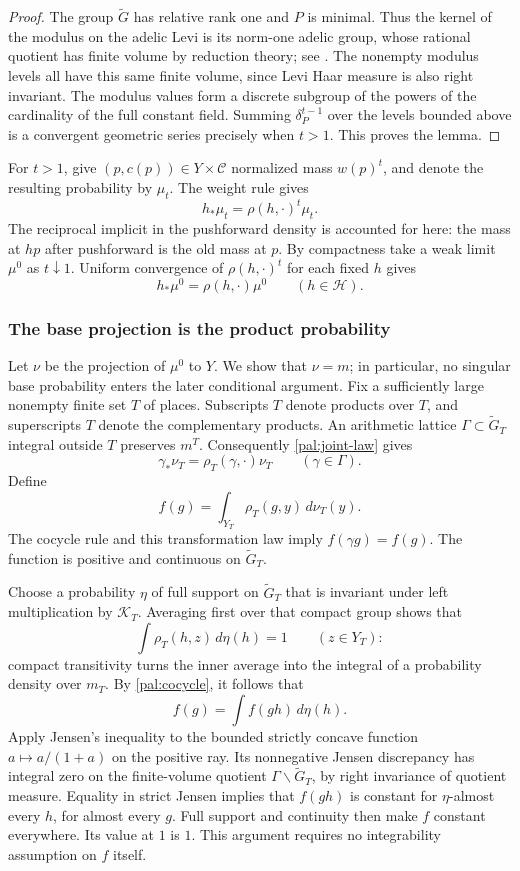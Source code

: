 \begin{proof}
The group $\widetilde G$ has relative rank one and $P$ is minimal.
Thus the kernel of the modulus on the adelic Levi is its norm-one
adelic group, whose rational quotient has finite volume by reduction
theory; see \cite{HarderReduction}.  The nonempty modulus levels all
have this same finite volume, since Levi Haar measure is also right
invariant.  The modulus values form a discrete subgroup of the powers
of the cardinality of the full constant field.  Summing
$\delta_P^{t-1}$ over the levels bounded above is a convergent geometric
series precisely when $t>1$.  This proves the lemma.
\end{proof}

For $t>1$, give $(p,c(p))\in Y\times\mathcal C$ normalized mass
$w(p)^t$, and denote the resulting probability by $\mu_t$.
The weight rule gives
\[
 h_*\mu_t=\rho(h,\cdot)^t\mu_t.
\]
The reciprocal implicit in the pushforward density is accounted for
here: the mass at $hp$ after pushforward is the old mass at $p$.
By compactness take a weak limit $\mu^0$ as $t\downarrow1$.  Uniform
convergence of $\rho(h,\cdot)^t$ for each fixed $h$ gives
\begin{equation}\label{pal:joint-law}
 h_*\mu^0=\rho(h,\cdot)\mu^0\qquad(h\in\mathcal H).
\end{equation}

\subsubsection{The base projection is the product probability}

Let $\nu$ be the projection of $\mu^0$ to $Y$.  We show that $\nu=m$;
in particular, no singular base probability enters the later conditional
argument.  Fix a sufficiently large nonempty finite set $T$ of places.
Subscripts $T$ denote products over $T$, and superscripts $T$ denote
the complementary products.  An arithmetic lattice
$\Gamma\subset\widetilde G_T$ integral outside $T$ preserves $m^T$.
Consequently \eqref{pal:joint-law} gives
\[
 \gamma_*\nu_T=\rho_T(\gamma,\cdot)\nu_T\qquad(\gamma\in\Gamma).
\]
Define
\[
 f(g)=\int_{Y_T}\rho_T(g,y)\,d\nu_T(y).
\]
The cocycle rule and this transformation law imply
$f(\gamma g)=f(g)$.  The function is positive and continuous on
$\widetilde G_T$.

Choose a probability $\eta$ of full support on $\widetilde G_T$ that is
invariant under left multiplication by $\mathcal K_T$.  Averaging first
over that compact group shows that
\[
 \int\rho_T(h,z)\,d\eta(h)=1\qquad(z\in Y_T):
\]
compact transitivity turns the inner average into the integral of a
probability density over $m_T$.  By \eqref{pal:cocycle}, it follows that
\[
 f(g)=\int f(gh)\,d\eta(h).
\]
Apply Jensen's inequality to the bounded strictly concave function
$a\mapsto a/(1+a)$ on the positive ray.  Its nonnegative Jensen
discrepancy has integral zero on the finite-volume quotient
$\Gamma\backslash\widetilde G_T$, by right invariance of quotient
measure.  Equality in strict Jensen implies that $f(gh)$ is constant
for $\eta$-almost every $h$, for almost every $g$.  Full support and
continuity then make $f$ constant everywhere.  Its value at $1$ is $1$.
This argument requires no integrability assumption on $f$ itself.

